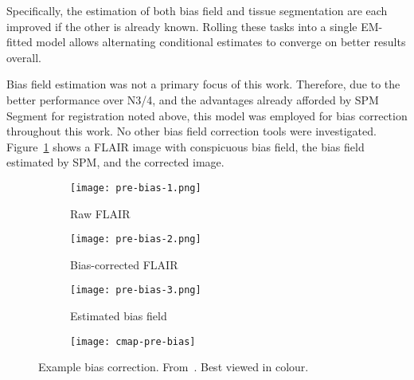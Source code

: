 Specifically, the estimation of both bias field and tissue segmentation are each improved
if the other is already known.
Rolling these tasks into a single EM-fitted model allows
alternating conditional estimates to converge on better results overall.
\par
Bias field estimation was not a primary focus of this work.
Therefore, due to the better performance over N3/4,
and the advantages already afforded by SPM Segment for registration noted above,
this model was employed for bias correction throughout this work.
No other bias field correction tools were investigated.
Figure~\ref{fig:pre-bias} shows a FLAIR image with conspicuous bias field,
the bias field estimated by SPM, and the corrected image.
\par
\begin{figure}
  \centering
  \begin{subfigure}{0.3\textwidth}
    \centering
    \texttt{[image: pre-bias-1.png]}
    \caption{Raw FLAIR}
  \end{subfigure}
  \begin{subfigure}{0.3\textwidth}
    \centering
    \texttt{[image: pre-bias-2.png]}
    \caption{Bias-corrected FLAIR}
  \end{subfigure}
  \begin{subfigure}{0.30\textwidth}
    \centering
    \texttt{[image: pre-bias-3.png]}
    \caption{Estimated bias field}
  \end{subfigure}
  \begin{subfigure}{0.04\textwidth}
    \texttt{[image: cmap-pre-bias]}
    \\\vphantom{(x)}
  \end{subfigure}
  \caption{Example bias correction. From~\cite{WMHSEG2017}. Best viewed in colour.}%
  \label{fig:pre-bias}
\end{figure}
